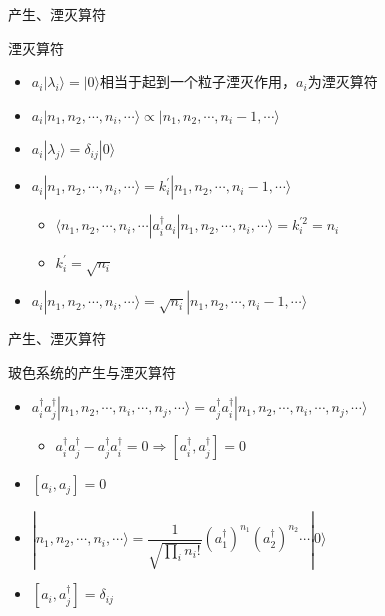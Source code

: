 \documentclass{beamer}
\begin{document}
\begin{frame}{产生、湮灭算符}
	\begin{block}{湮灭算符}
		\begin{itemize}
			\item $a_{i}|\lambda_{i}\rangle=|0\rangle$相当于起到一个粒子湮灭作用，$a_{i}$为湮灭算符
			\item $a_{i}|n_{1},n_{2},\cdots, n_{i},\cdots\rangle\propto |n_{1},n_{2},\cdots, n_{i}-1,\cdots\rangle$
			\item $a_{i}|\lambda_{j}\rangle=\delta_{ij}|0\rangle$
			\item $a_{i}|n_{1},n_{2},\cdots,n_{i},\cdots\rangle=k_{i}^{\prime} |n_{1},n_{2},\cdots,n_{i}-1,\cdots\rangle$
			\begin{itemize}
				\item $\langle n_{1},n_{2},\cdots,n_{i},\cdots|a_{i}^{\dagger}a_{i}|n_{1},n_{2},\cdots,n_{i},\cdots\rangle=k_{i}^{\prime2}=n_{i}$
				\item $k_{i}^{\prime}=\sqrt{n_{i}}$
			\end{itemize}
			\item $a_{i}|n_{1},n_{2},\cdots,n_{i},\cdots\rangle=\sqrt{n_{i}} |n_{1},n_{2},\cdots,n_{i}-1,\cdots\rangle$
		\end{itemize}
	\end{block}
\end{frame}
    \begin{frame}{产生、湮灭算符}
    	\begin{block}{玻色系统的产生与湮灭算符}
    		\begin{itemize}
    			\item\small{ $a_{i}^{\dagger}a_{j}^{\dagger}|n_{1},n_{2},\cdots,n_{i},\cdots,n_{j},\cdots\rangle=a_{j}^{\dagger}a_{i}^{\dagger}|n_{1},n_{2},\cdots,n_{i},\cdots,n_{j},\cdots\rangle$}
    			\begin{itemize}
    				\item $a_{i}^{\dagger}a_{j}^{\dagger}-a_{j}^{\dagger}a_{i}^{\dagger}=0\Rightarrow [a_{i}^{\dagger},a_{j}^{\dagger}]=0$
    			\end{itemize}
    			\item $[a_{i},a_{j}]=0$
    			\item $|n_{1},n_{2},\cdots,n_{i},\cdots\rangle=\dfrac{1}{\sqrt{\prod\limits_{i}n_{i}!}}(a_{1}^{\dagger})^{n_{1}}(a_{2}^{\dagger})^{n_{2}}\cdots |0\rangle$
    			\item $[a_{i},a_{j}^{\dagger}]=\delta_{ij}$
    		\end{itemize}
    	\end{block}
    \end{frame}
\end{document}

